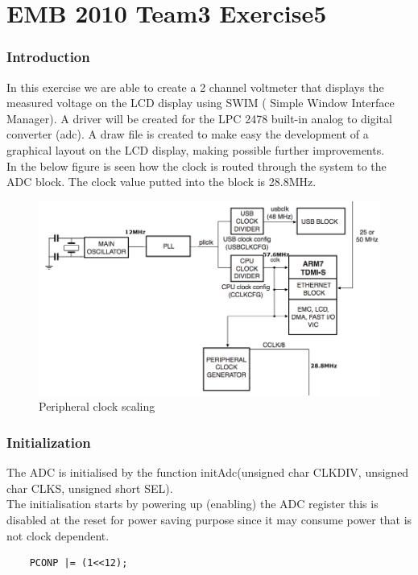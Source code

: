 

\part*{EMB 2010 Team3 Exercise5}
\section{Introduction}
In this exercise we  are able to create a 2 channel voltmeter that displays the measured voltage on the LCD display using SWIM ( Simple Window Interface Manager).
A driver will be created for the LPC 2478 built-in analog to digital converter (adc).
A draw file is created to make easy the development of a graphical layout on the LCD display, making possible further improvements. 
\\ \newline
In the below figure is seen how the clock is routed through the system to the ADC block. The clock value putted into the block is 28.8MHz.
\\ \newline
\begin{figure}[h!]
   \centering
   \includegraphics[width=1\textwidth]{peripheral_clock_gen.png}
   \caption{Peripheral clock scaling}
   \label{fig:example}
\end{figure}

\newpage
\section{Initialization}

The ADC is initialised by the function initAdc(unsigned char CLKDIV, unsigned char CLKS, unsigned short SEL).
\\ \newline
The initialisation starts by powering up (enabling) the ADC register this is disabled at the reset for power saving purpose since it may consume power that is not clock dependent.
\begin{lstlisting} 
	PCONP |= (1<<12);
 \end{lstlisting}

